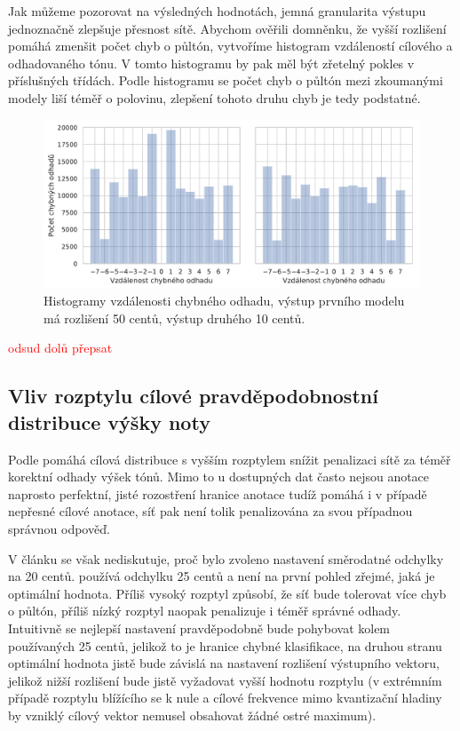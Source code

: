 Jak můžeme pozorovat na výsledných hodnotách, jemná granularita výstupu jednoznačně zlepšuje přesnost sítě. Abychom ověřili domněnku, že vyšší rozlišení pomáhá zmenšit počet chyb o půltón, vytvoříme histogram vzdáleností cílového a odhadovaného tónu. V tomto histogramu by pak měl být zřetelný pokles v příslušných třídách. Podle histogramu se počet chyb o půltón mezi zkoumanými modely liší téměř o polovinu, zlepšení tohoto druhu chyb je tedy podstatné.

\begin{figure}[h]\centering
    \includegraphics[scale=0.6]{../img/figures/crepe_diskretizace_hist.pdf}
\caption{Histogramy vzdálenosti chybného odhadu, výstup prvního modelu má rozlišení 50 centů, výstup druhého 10 centů.}\label{obr:crepe_diskretizace}
\end{figure}

\textcolor{red}{odsud dolů přepsat}

\subsection{Vliv rozptylu cílové pravděpodobnostní distribuce výšky noty}

Podle \cite{Bittner2017} pomáhá cílová distribuce s vyšším rozptylem snížit penalizaci sítě za téměř korektní odhady výšek tónů. Mimo to u dostupných dat často nejsou anotace naprosto perfektní, jisté rozostření hranice anotace tudíž pomáhá i v případě nepřesné cílové anotace, síť pak není tolik penalizována za svou případnou správnou odpověď. 

V článku se však nediskutuje, proč bylo zvoleno nastavení směrodatné odchylky na 20 centů. \cite{Kim2018} používá odchylku 25 centů a není na první pohled zřejmé, jaká je optimální hodnota. Příliš vysoký rozptyl způsobí, že síť bude tolerovat více chyb o půltón, příliš nízký rozptyl naopak penalizuje i téměř správné odhady. Intuitivně se nejlepší nastavení pravděpodobně bude pohybovat kolem používaných 25 centů, jelikož to je hranice chybné klasifikace, na druhou stranu optimální hodnota jistě bude závislá na nastavení rozlišení výstupního vektoru, jelikož nižší rozlišení bude jistě vyžadovat vyšší hodnotu rozptylu (v extrémním případě rozptylu blížícího se k nule a cílové frekvence mimo kvantizační hladiny by vzniklý cílový vektor nemusel obsahovat žádné ostré maximum).


